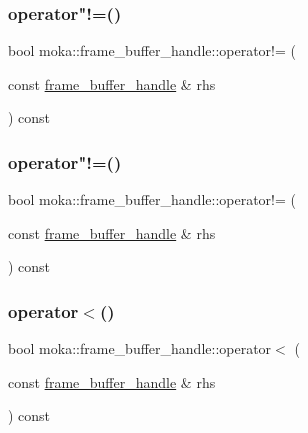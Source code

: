 \subsubsection{\texorpdfstring{operator"!=()}{operator!=()}\hspace{0.1cm}{\footnotesize\ttfamily [1/2]}}
{\footnotesize\ttfamily bool moka\+::frame\+\_\+buffer\+\_\+handle\+::operator!= (\begin{DoxyParamCaption}\item[{const \mbox{\hyperlink{structmoka_1_1frame__buffer__handle}{frame\+\_\+buffer\+\_\+handle}} \&}]{rhs }\end{DoxyParamCaption}) const}

\mbox{\label{structmoka_1_1frame__buffer__handle_a98984b93552728bed0e67073c3412c3c}} 
\subsubsection{\texorpdfstring{operator"!=()}{operator!=()}\hspace{0.1cm}{\footnotesize\ttfamily [2/2]}}
{\footnotesize\ttfamily bool moka\+::frame\+\_\+buffer\+\_\+handle\+::operator!= (\begin{DoxyParamCaption}\item[{const \mbox{\hyperlink{structmoka_1_1frame__buffer__handle}{frame\+\_\+buffer\+\_\+handle}} \&}]{rhs }\end{DoxyParamCaption}) const}

\mbox{\label{structmoka_1_1frame__buffer__handle_a6647204ed60a12d61789981e99fa6c4f}} 
\subsubsection{\texorpdfstring{operator$<$()}{operator<()}\hspace{0.1cm}{\footnotesize\ttfamily [1/2]}}
{\footnotesize\ttfamily bool moka\+::frame\+\_\+buffer\+\_\+handle\+::operator$<$ (\begin{DoxyParamCaption}\item[{const \mbox{\hyperlink{structmoka_1_1frame__buffer__handle}{frame\+\_\+buffer\+\_\+handle}} \&}]{rhs }\end{DoxyParamCaption}) const}


